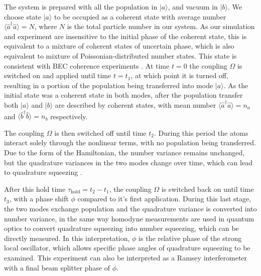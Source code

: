 \documentclass{iopart}
\begin{document}
The system is prepared with all the population in $|a\rangle$, and vacuum in $|b\rangle$. We choose state $|a\rangle$ to be occupied as a coherent state with average number $\langle \hat{a}^{\dagger} \hat{a} \rangle = N$, where $N$ is the total particle number in our system.  As our simulation and experiment are insensitive to the initial phase of the coherent state, this is equivalent to a mixture of coherent states of uncertain phase, which is also equivalent to mixture of Poissonian-distributed number states.  This state is consistent with BEC coherence experiments \cite{Hadzibabic2004}.  
At time $t=0$ the coupling $\Omega$ is switched on and applied until time $t=t_1$, at which point it is turned off, resulting in a portion of the population being transferred into mode $|a\rangle$. As the initial state was a coherent state in both modes, after the population transfer both $|a\rangle$ and $|b\rangle$ are described by coherent states, with mean number $\langle \hat{a}^{\dagger} \hat{a} \rangle = n_a$ and $\langle \hat{b}^{\dagger} \hat{b} \rangle = n_b$ respectively.

The coupling $\Omega$ is then switched off until time $t_2$. During this period the atoms interact solely through the nonlinear terms, with no population being transferred. Due to the form of the Hamiltonian, the number variance remains unchanged, but the quadrature variances in the two modes change over time, which can lead to quadrature squeezing \cite{xxx}.

After this hold time $\tau_{\mathrm{hold}} = t_2 - t_1 $, the coupling $\Omega$ is switched back on until time $t_3$, with a phase shift $\phi$ compared to it's first application. During this last stage, the two modes exchange population and the quadrature variance is converted into number variance, in the same way homodyne measurements are used in quantum optics to convert quadrature squeezing into number squeezing, which can be directly measured. In this interpretation, $\phi$ is the relative phase of the strong local oscillator, which allows specific phase angles of quadrature squeezing to be examined.  This experiment can also be interpreted as a Ramsey interferometer with a final beam splitter phase of $\phi$.
\end{document}
